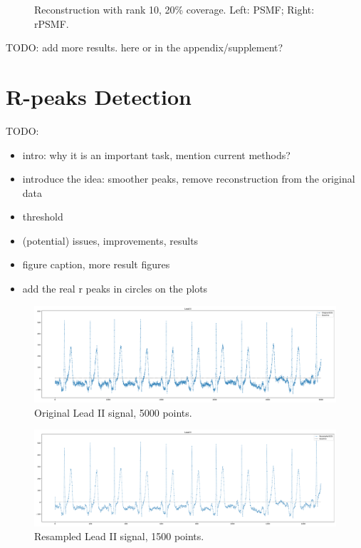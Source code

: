 \documentclass{mldsmsc}
\begin{document}
\begin{figure}[H]
\begin{minipage}{0.4\linewidth}
    \label{fig:augmented}
\end{minipage}
\caption{Reconstruction with rank 10, 20\% coverage. Left: PSMF; Right: rPSMF.}
\end{figure}

\noindent TODO: add more results. here or in the appendix/supplement?

\section{R-peaks Detection}

TODO:
\begin{itemize}
    \item intro: why it is an important task, mention current methods?
    \item introduce the idea: smoother peaks, remove reconstruction from the original data
    \item threshold
    \item (potential) issues, improvements, results
    \item figure caption, more result figures
    \item add the real r peaks in circles on the plots
\end{itemize}

\begin{figure}[H]
\centering
\includegraphics[width=1\linewidth]{images/r_peaks/original_ecg_m.pdf}
\caption{Original Lead II signal, 5000 points.}
\label{fig:orig-ecg}
\end{figure}

\begin{figure}[H]
\centering
\includegraphics[width=1\linewidth]{images/r_peaks/resampled_ecg_m.pdf}
\caption{Resampled Lead II signal, 1500 points.}
\label{fig:resampled-ecg}
\end{figure}
\end{document}
